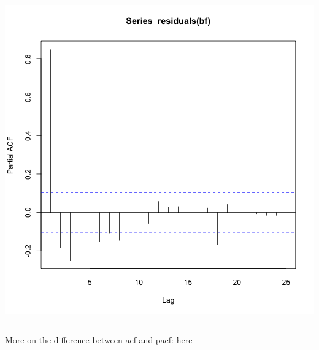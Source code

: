 \documentclass{beamer}
\begin{document}
\begin{frame}[fragile]
\begin{columns}
\begin{column}{0.5\textwidth}
        \includegraphics[width=\textwidth]{lectures/day_4_GLS/figures/unnamed-chunk-23-1.png}  
      \end{column}
  \end{columns}
  \footnotesize More on the difference between acf and pacf: \color{blue}\href{https://stats.stackexchange.com/questions/483383/difference-between-autocorrelation-and-partial-autocorrelation}{here}
\end{frame}
\end{document}
